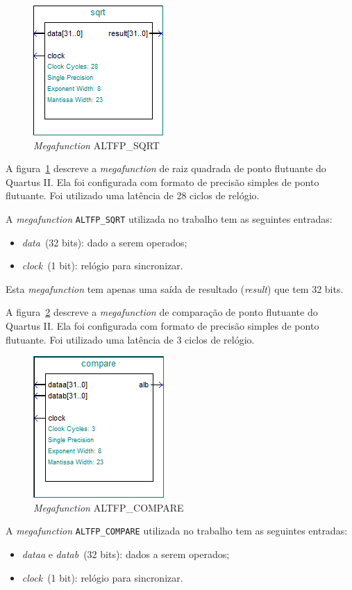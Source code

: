 \begin{figure}[h]
\centering
\includegraphics[width=.3\textwidth]{../apresentacao/sqrt}
\caption{\textit{Megafunction} ALTFP\_SQRT}
\label{fig:sqrt}
\end{figure}

A figura~\ref{fig:sqrt} descreve a \textit{megafunction} de raiz quadrada de
ponto flutuante do Quartus II. Ela foi configurada com formato de precisão
simples de ponto flutuante. Foi utilizado uma latência de 28 ciclos de relógio.

A \textit{megafunction} \verb|ALTFP_SQRT| utilizada no trabalho tem as
seguintes entradas:
\begin{itemize}
\item \textit{data}~(32 bits): dado a serem operados;
\item \textit{clock}~(1 bit): relógio para sincronizar.
\end{itemize}

Esta \textit{megafunction} tem apenas uma saída de resultado (\textit{result})
que tem 32 bits.


A figura~\ref{fig:compare} descreve a \textit{megafunction} de comparação de
ponto flutuante do Quartus II. Ela foi configurada com formato de precisão
simples de ponto flutuante. Foi utilizado uma latência de 3 ciclos de relógio.

\begin{figure}[h]
\centering
\includegraphics[width=.3\textwidth]{../apresentacao/compare}
\caption{\textit{Megafunction} ALTFP\_COMPARE}
\label{fig:compare}
\end{figure}

A \textit{megafunction} \verb|ALTFP_COMPARE| utilizada no trabalho tem as
seguintes entradas:
\begin{itemize}
\item \textit{dataa} e \textit{datab}~(32 bits): dados a serem operados;
\item \textit{clock}~(1 bit): relógio para sincronizar.
\end{itemize}

